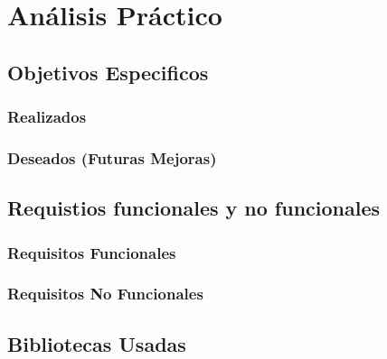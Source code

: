 \chapter{Análisis Práctico}\label{ch:practical_analytics}

\section{Objetivos Especificos}
\subsection{Realizados}
\subsection{Deseados (Futuras Mejoras)}

\section{Requistios funcionales y no funcionales}
\subsection{Requisitos Funcionales}
\subsection{Requisitos No Funcionales}

\section{Bibliotecas Usadas}
